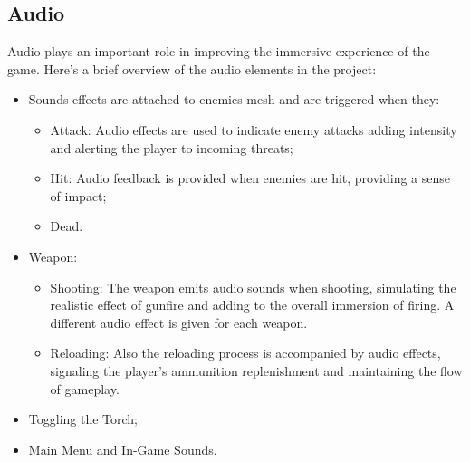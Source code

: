 \documentclass[12pt,a4paper,oneside]{article}
\theoremstyle{definition}
\begin{document}
\subsection{Audio}
Audio plays an important role in improving the immersive experience of the game. Here's a brief overview of the audio elements in the project:
\begin{itemize}
    \item Sounds effects are attached to enemies mesh and are triggered  when they:
    \begin{itemize}
        \item Attack: Audio effects are used to indicate enemy attacks adding intensity and alerting the player to incoming threats;
        \item Hit: Audio feedback is provided when enemies are hit, providing a sense of impact;
        \item Dead.
    \end{itemize}
    \item Weapon:
    \begin{itemize}
        \item Shooting: The weapon emits audio sounds when shooting, simulating the realistic effect of gunfire and adding to the overall immersion of firing. A different audio effect is given for each weapon.
        \item Reloading: Also the reloading process is accompanied by audio effects, signaling the player's ammunition replenishment and maintaining the flow of gameplay.
    \end{itemize}
    \item Toggling the Torch;
    \item Main Menu and In-Game Sounds.

\end{itemize}
\end{document}
